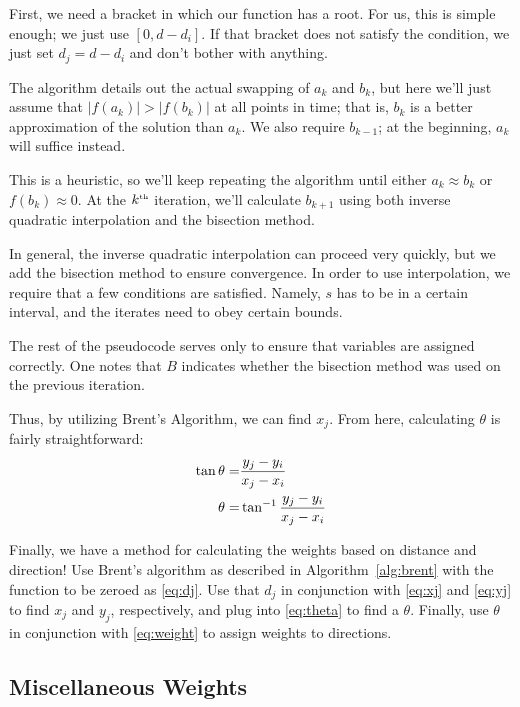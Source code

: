 \documentclass[twocolumn,12pt]{article}
\begin{document}
First, we need a bracket in which our function has a root. For us, this is
simple enough; we just use $[0, d-d_i]$. If that bracket does not satisfy the
condition, we just set $d_j = d-d_i$ and don't bother with anything.

The algorithm details out the actual swapping of $a_k$ and $b_k$, but here
we'll just assume that $|f(a_k)| > |f(b_k)|$ at all points in time; that is,
$b_k$ is a better approximation of the solution than $a_k$. We also require
$b_{k-1}$; at the beginning, $a_k$ will suffice instead.

This is a heuristic, so we'll keep repeating the algorithm until either
$a_k \approx b_k$ or $f(b_k) \approx 0$. At the $k^{\mbox{{\tiny th}}}$ iteration,
we'll calculate $b_{k+1}$ using both inverse quadratic interpolation and the
bisection method.

In general, the inverse quadratic interpolation can proceed very quickly, but we
add the bisection method to ensure convergence. In order to use interpolation,
we require that a few conditions are satisfied. Namely, $s$ has to be in a certain
interval, and the iterates need to obey certain bounds.

The rest of the pseudocode serves only to ensure that variables are assigned
correctly. One notes that $B$ indicates whether the bisection method was used
on the previous iteration.

Thus, by utilizing Brent's Algorithm, we can find $x_j$. From here, calculating
$\theta$ is fairly straightforward:
\begin{align}
  \tan \theta = & \frac{y_j - y_i}{x_j-x_i} \notag \\
  \theta = & \tan^{-1} \frac{y_j - y_i}{x_j-x_i} \label{eq:theta}
\end{align}

Finally, we have a method for calculating the weights based on distance and
direction! Use Brent's algorithm as described in Algorithm~\ref{alg:brent}
with the function to be zeroed as \eqref{eq:dj}. Use that $d_j$ in conjunction
with \eqref{eq:xj} and \eqref{eq:yj} to find
$x_j$ and $y_j$, respectively, and plug into \eqref{eq:theta} to find a
$\theta$. Finally, use $\theta$ in conjunction with \eqref{eq:weight} to assign
weights to directions.

\subsection{Miscellaneous Weights}
\end{document}
